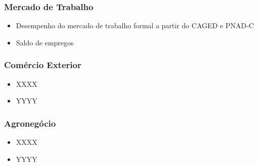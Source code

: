 \documentclass[12pt,aspectratio=169]{beamer}
\begin{document}
\begin{frame}
	\frametitle{Mercado de Trabalho}
	
	\begin{itemize}
		\item Desempenho do mercado de trabalho formal a partir do CAGED e PNAD-C
		\item Saldo de empregos
	\end{itemize}

\begin{figure}%
	\centering
	\qquad
\end{figure}

\end{frame}

\begin{frame}
	\frametitle{Comércio Exterior}
	\begin{itemize}
		\item XXXX
		\item YYYY
	\end{itemize}
\end{frame}

\begin{frame}
	\frametitle{Agronegócio}
	\begin{itemize}
		\item XXXX
		\item YYYY
	\end{itemize}
\end{frame}
\end{document}
